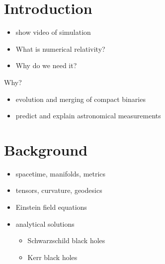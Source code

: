 \documentclass[twocolumn]{article}
\begin{document}
  \cleardoublepage

  \section{Introduction} %
  \label{sec:introduction}
    \begin{itemize}
      \item show video of simulation
      \item What is numerical relativity?
      \item Why do we need it?
    \end{itemize}

    Why?
    \begin{itemize}
      \item evolution and merging of compact binaries
      \item predict and explain astronomical measurements
    \end{itemize}

  \section{Background} %
  \label{sec:background}
    \begin{itemize}
      \item spacetime, manifolds, metrics
      \item tensors, curvature, geodesics
      \item Einstein field equations
      \item analytical solutions
        \begin{itemize}
          \item Schwarzschild black holes
          \item Kerr black holes
        \end{itemize}
    \end{itemize}
\end{document}
